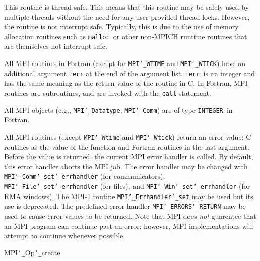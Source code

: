 \par
{}
\par
This routine is thread-safe.  This means that this routine may be
safely used by multiple threads without the need for any user-provided
thread locks.  However, the routine is not interrupt safe.  Typically,
this is due to the use of memory allocation routines such as {\tt malloc
}or other non-MPICH runtime routines that are themselves not interrupt-safe.
\par
{}
All MPI routines in Fortran (except for {\tt MPI{\tt \char`\_}WTIME} and {\tt MPI{\tt \char`\_}WTICK}) have
an additional argument {\tt ierr} at the end of the argument list.  {\tt ierr
}is an integer and has the same meaning as the return value of the routine
in C.  In Fortran, MPI routines are subroutines, and are invoked with the
{\tt call} statement.
\par
All MPI objects (e.g., {\tt MPI{\tt \char`\_}Datatype}, {\tt MPI{\tt \char`\_}Comm}) are of type {\tt INTEGER
}in Fortran.
\par
{}
\par
All MPI routines (except {\tt MPI{\tt \char`\_}Wtime} and {\tt MPI{\tt \char`\_}Wtick}) return an error value;
C routines as the value of the function and Fortran routines in the last
argument.  Before the value is returned, the current MPI error handler is
called.  By default, this error handler aborts the MPI job.  The error handler
may be changed with {\tt MPI{\tt \char`\_}Comm{\tt \char`\_}set{\tt \char`\_}errhandler} (for communicators),
{\tt MPI{\tt \char`\_}File{\tt \char`\_}set{\tt \char`\_}errhandler} (for files), and {\tt MPI{\tt \char`\_}Win{\tt \char`\_}set{\tt \char`\_}errhandler} (for
RMA windows).  The MPI-1 routine {\tt MPI{\tt \char`\_}Errhandler{\tt \char`\_}set} may be used but
its use is deprecated.  The predefined error handler
{\tt MPI{\tt \char`\_}ERRORS{\tt \char`\_}RETURN} may be used to cause error values to be returned.
Note that MPI does {\em not} guarentee that an MPI program can continue past
an error; however, MPI implementations will attempt to continue whenever
possible.
\par
{}
\par
{}
 MPI{\tt \char`\_}Op{\tt \char`\_}create
\nextline
{}
\endmanpage
